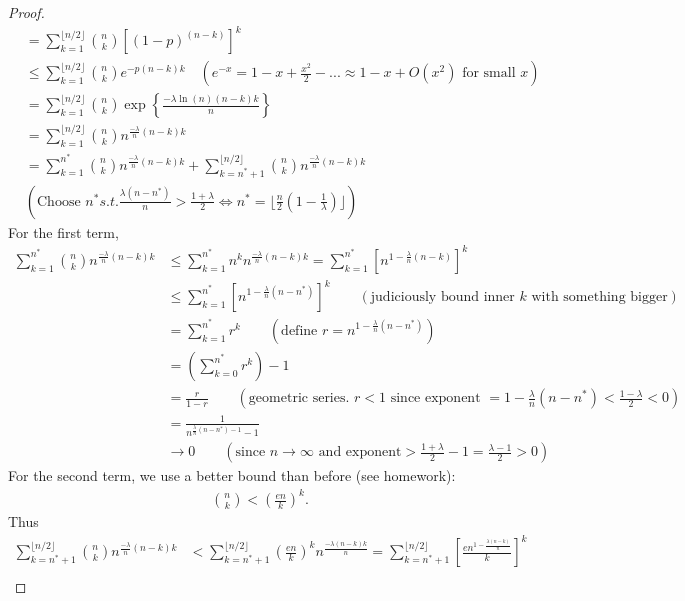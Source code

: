 \documentclass[./some_latex_template.tex]{subfiles}
\begin{document}
\begin{proof}
\begin{align*}
	&= \sum_{k=1}^{\lfloor n/2 \rfloor} {n \choose k} \left[ (1-p)^{(n - k)} \right]^k\\
	&\le \sum_{k=1}^{\lfloor n/2 \rfloor} {n \choose k} e^{-p(n-k)k} \quad \left(e^{-x} = 1 - x + \frac{x^2}{2} - ... \approx 1 - x + O(x^2) \text{ for small }x\right)\\
	&= \sum_{k=1}^{\lfloor n/2 \rfloor} {n \choose k} \exp\left\{\frac{-\lambda \ln(n)(n-k)k}{n}\right\}\\
	&= \sum_{k=1}^{\lfloor n/2 \rfloor} {n \choose k} n^{\frac{-\lambda}{n}(n-k)k}\\
	&= \sum_{k=1}^{n^*} {n \choose k} n^{\frac{-\lambda}{n}(n-k)k} + \sum_{k=n^* + 1}^{\lfloor n/2 \rfloor} {n \choose k} n^{\frac{-\lambda}{n}(n-k)k}\\
	&\left(\text{Choose } n^* s.t. \frac{\lambda(n - n^*)}{n}>\frac{1 + \lambda}{2} \iff n^* = \lfloor \frac{n}{2}(1 - \frac{1}{\lambda}) \rfloor\right)
\end{align*}
For the first term, 
\begin{align*}
	\sum_{k=1}^{n^*} {n \choose k} n^{\frac{-\lambda}{n}(n-k)k}
	&\le \sum_{k=1}^{n^*} n^k n^{\frac{-\lambda}{n}(n-k)k} = \sum_{k=1}^{n^*} \left[ n^{1 - \frac{\lambda}{n}(n-k)} \right]^k\\
	&\le \sum_{k=1}^{n^*} \left[ n^{1 - \frac{\lambda}{n}(n-n^*)} \right]^k \qquad \left(\text{judiciously bound inner } k \text{ with something bigger}\right)\\
	&= \sum_{k=1}^{n^*} r^k \qquad \left(\text{define } r = n^{1 - \frac{\lambda}{n}(n-n^*)}\right)\\
	&= \left(\sum_{k=0}^{n^*} r^k\right) - 1\\
	&= \frac{r}{1-r} \qquad \left(\text{geometric series. } r < 1 \text{ since exponent } = 1 - \frac{\lambda}{n}(n - n^*) < \frac{1 - \lambda}{2} < 0\right)\\
	&= \frac{1}{n^{\frac{\lambda}{n}(n-n^*) - 1} - 1}\\
	&\longrightarrow 0 \qquad \left(\text{since } n \rightarrow \infty \text{ and exponent} > \frac{1 + \lambda}{2} - 1 = \frac{\lambda - 1}{2} > 0\right)
\end{align*}
For the second term, we use a better bound than before (see homework):
\begin{align*}
	{n \choose k} < \left(\frac{en}{k}\right)^k.
\end{align*}
Thus 
\begin{align*}
	\sum_{k=n^* + 1}^{\lfloor n/2 \rfloor} {n \choose k} n^{\frac{-\lambda}{n}(n-k)k} 
	&< \sum_{k=n^* + 1}^{\lfloor n/2 \rfloor} \left(\frac{en}{k}\right)^k n^{\frac{-\lambda(n-k)k}{n}} = \sum_{k=n^* + 1}^{\lfloor n/2 \rfloor} \left[ \frac{en^{1 - \frac{\lambda(n-k)}{n}}}{k}\right]^k\\

\end{align*}
\end{proof}
\end{document}
